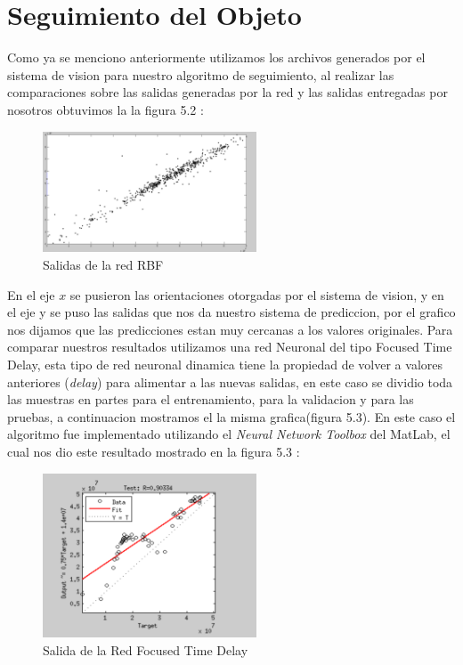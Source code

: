 \section{Seguimiento del Objeto}
Como  ya se menciono anteriormente utilizamos los archivos generados por el sistema de vision para nuestro algoritmo de seguimiento, al realizar las comparaciones sobre las salidas generadas por la red y las salidas entregadas por nosotros obtuvimos la la figura 5.2 :
\begin{figure}
	\centering
	\includegraphics[width=2.5in]{salidaRBF.pdf}
	\caption{Salidas de la red RBF}
	\label{fig_mar}
\end{figure}
En el eje $x$ se pusieron las orientaciones otorgadas por el sistema de vision, y en el eje y se puso las salidas que nos da nuestro sistema de prediccion, por el grafico nos dijamos que las predicciones estan muy cercanas a los valores originales.
Para comparar nuestros resultados utilizamos una red Neuronal del tipo Focused Time Delay, esta tipo de red neuronal dinamica tiene la propiedad de volver a valores anteriores (\textit{delay}) para alimentar a las nuevas salidas, en este caso se dividio toda las muestras en partes para el entrenamiento, para la validacion y para las pruebas, a continuacion mostramos el la misma grafica(figura 5.3). En este caso el algoritmo fue implementado utilizando el  \textit{Neural Network Toolbox} del MatLab, el cual nos dio este resultado mostrado en la figura 5.3 :
\begin{figure}
	\centering
	\includegraphics[width=2.5in]{salidaNAR.pdf}
	\caption{Salida de la Red Focused Time Delay}
	\label{fig_mar}
\end{figure}
